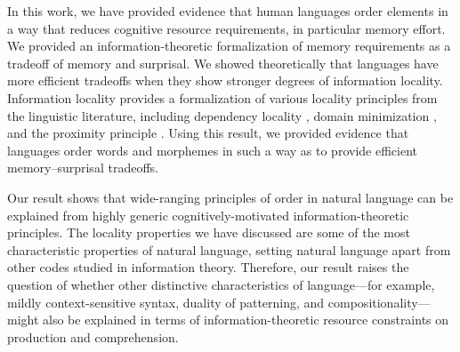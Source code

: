 \documentclass[11pt,letterpaper]{article}
\begin{document}
In this work, we have provided evidence that human languages order elements in a way that reduces cognitive resource requirements, in particular memory effort.
We provided an information-theoretic formalization of memory requirements as a tradeoff of memory and surprisal.
We showed theoretically that languages have more efficient tradeoffs when they show stronger degrees of information locality.
Information locality provides a formalization of various locality principles from the linguistic literature, including dependency locality \citep{gibson1998linguistic}, domain minimization \citep{hawkins2004efficiency}, and the proximity principle \citep{givon1985iconicity}.
Using this result, we provided evidence that languages order words and morphemes in such a way as to provide efficient memory--surprisal tradeoffs.

Our result shows that wide-ranging principles of order in natural language can be explained from highly generic cognitively-motivated information-theoretic principles. The locality properties we have discussed are some of the most characteristic properties of natural language, setting natural language apart from other codes studied in information theory.
Therefore, our result raises the question of whether other distinctive characteristics of language---for example, mildly context-sensitive syntax, duality of patterning, and compositionality---might also be explained in terms of information-theoretic resource constraints on production and comprehension.





\end{document}
